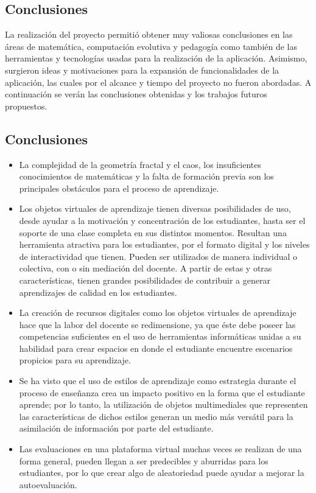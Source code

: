 \documentclass[letterpaper, 11pt, oneside]{article}
\theoremstyle{definition}
\theoremstyle{remark}
\begin{document}
\clearpage
\begin{center}
 \section{Conclusiones}
\end{center}

La realización del proyecto permitió obtener muy valiosas conclusiones en las áreas de matemática, computación evolutiva y pedagogía como también de las herramientas y tecnologías usadas para la realización de la aplicación. Asimismo, surgieron ideas y motivaciones para la expansión de funcionalidades de la aplicación, las cuales por el alcance y tiempo del proyecto no fueron abordadas. A continuación se verán las conclusiones obtenidas y los trabajos futuros propuestos.\\

  \subsection{Conclusiones}
\begin{itemize}
 \item  La complejidad de la geometría fractal y el caos, los insuficientes conocimientos de matemáticas y la falta de formación previa son los principales obstáculos para el proceso de aprendizaje.
 \item Los objetos virtuales de aprendizaje tienen diversas posibilidades de uso, desde ayudar a la motivación y concentración de los estudiantes, hasta ser el soporte de una clase completa en sus distintos momentos. Resultan una herramienta atractiva para los estudiantes, por el formato digital y los niveles de interactividad que tienen. Pueden ser utilizados de manera individual o colectiva, con o sin mediación del docente. A partir de estas y otras características, tienen grandes posibilidades de contribuir a generar aprendizajes de calidad en los estudiantes.  
 \item La creación de recursos digitales como los objetos virtuales de aprendizaje hace que la labor del docente se redimensione, ya que éste debe poseer las competencias suficientes en el uso de herramientas informáticas unidas a su habilidad para crear espacios en donde el estudiante encuentre escenarios propicios para su aprendizaje.
\item Se ha visto que el uso de estilos de aprendizaje como estrategia durante el proceso de enseñanza crea un impacto positivo en la forma que el estudiante aprende; por lo tanto, la utilización de objetos multimediales que representen las características de dichos estilos generan un medio más versátil para la asimilación de información por parte del estudiante.
 \item Las evaluaciones en una plataforma virtual muchas veces se realizan de una forma general, pueden llegan a ser predecibles y aburridas para los estudiantes, por lo que crear algo de aleatoriedad puede ayudar a mejorar la autoevaluación.  
\end{itemize}
\end{document}

